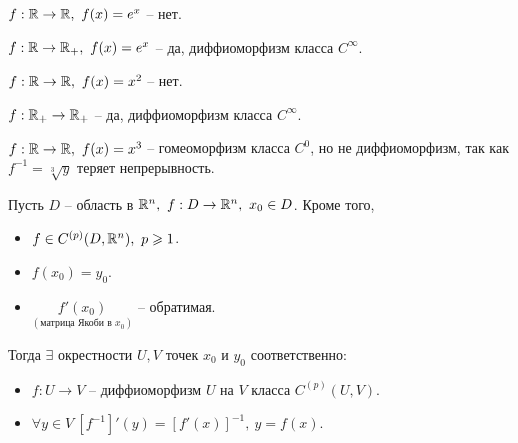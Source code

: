 \begin{example}
    $ f:\mathbb{R} \rightarrow\mathbb{R}, \ f(x) = e^x $ -- нет.

    $ f:\mathbb{R} \rightarrow\mathbb{R}_+, \ f(x) = e^x $ -- да, диффиоморфизм класса $ C^\infty $.
\end{example}

\begin{example}
    $ f:\mathbb{R} \rightarrow\mathbb{R}, \ f(x) = x^2 $ -- нет.

    $ f:\mathbb{R}_+ \rightarrow \mathbb{R}_+ $ -- да, диффиоморфизм класса $ C^\infty $.
\end{example}

\begin{example}
    $ f:\mathbb{R} \rightarrow\mathbb{R}, \ f(x) = x^3 $ -- гомеоморфизм класса $ C^0 $, но не диффиоморфизм, так как $ f^{-1} = \sqrt[3]{y} $ теряет непрерывность.
\end{example}

\begin{theorem}
    Пусть $ D $ -- область в $ \R^n, \ f:D \rightarrow \R^n, \ x_0 \in D $. Кроме того,
    \begin{itemize}
        \item $ f\in C^{(p)}(D,\mathbb{R}^n), \ p \geqslant 1 $.
        \item $ f(x_0) = y_0 $.
        \item $ \underset{(\text{матрица Якоби в }x_0)}{f'(x_0)} $ -- обратимая.
    \end{itemize}

    Тогда $ \exists $ окрестности $ U,V $ точек $ x_0 $ и $ y_0 $ соответственно:
    \begin{itemize}
        \item $ f:U \rightarrow V $ -- диффиоморфизм $ U $ на $ V $ класса $ C^{(p)}(U,V) $.
        \item $ \forall y \in V \ [f^{-1}]'(y) = [f'(x)]^{-1}, \ y = f(x) $.
    \end{itemize}
\end{theorem}

